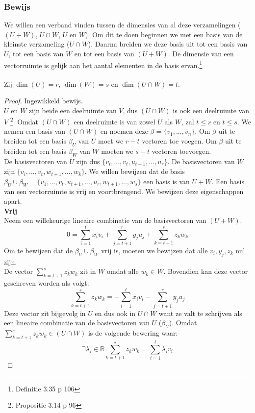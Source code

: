 \documentclass[lineaire_algebra_oplossingen.tex]{subfiles}
\begin{document}
\subsubsection*{Bewijs}
We willen een verband vinden tussen de dimensies van al deze verzamelingen ($(U+W)$, $U\cap W$, $U$ en $W$). Om dit te doen beginnen we met een basis van de kleinste verzameling ($U \cap W$). Daarna breiden we deze basis uit tot een basis van $U$, tot een basis van $W$ en tot een basis van $(U + W)$. De dimensie van een vectorruimte is gelijk aan het aantal elementen in de basis ervan.\footnote{Definitie 3.35 p 106}\\\\
Zij $\dim(U) = r$, $\dim(W)=s$ en $\dim(U\cap W) = t$.
\begin{proof}
Ingewikkeld bewijs.\\
$U$ en $W$ zijn beide een deelruimte van $V$, dus $(U \cap W)$ is ook een deelruimte van $V$ \footnote{Propositie 3.14 p 96}. Omdat $(U \cap W)$ een deelruimte is van zowel $U$ als $W$, zal $t \le r$ en $t \le s$. We nemen een basis van $(U\cap W)$ en noemen deze $\beta = \{v_1,...,v_n\}$. Om $\beta$ uit te breiden tot een basis $\beta_U$ van $U$ moet we $r-t$ vectoren toe voegen. Om $\beta$ uit te breiden tot een basis $\beta_W$ van $W$ moeten we $s-t$ vectoren toevoegen.\\
De basisvectoren van $U$ zijn dus $\{v_i,...,v_t,u_{t+1},...,u_r\}$. De basisvectoren van $W$ zijn $\{v_i,...,v_t,w_{t+1},...,w_k\}$.
We willen bewijzen dat de basis $\beta_U \cup \beta_W = \{v_1,...,v_t,u_{t+1},...,u_{r},w_{t+1},...,w_{s}\}$ een basis is van $U+W$.
Een basis van een vectorruimte is vrij en voortbrengend. We bewijzen deze eigenschappen apart.\\
\textbf{Vrij}\\
Neem een willekeurige lineaire combinatie van de basisvectoren van $(U+W)$.
\[
0 = \sum_{i=1}^tx_iv_i + \sum_{j=t+1}^ry_ju_j + \sum_{k=t+1}^sz_kw_k
\]
Om te bewijzen dat de $\beta_U \cup \beta_W$ vrij is, moeten we bewijzen dat alle $v_i,y_j,z_k$ nul zijn.\\
De vector $\sum_{k=t+1}^sz_kw_k$ zit in $W$ omdat alle $w_k \in W$. Bovendien kan deze vector geschreven worden als volgt:
\[
\sum_{k=t+1}^sz_kw_k = -\sum_{i=1}^tx_iv_i - \sum_{j=t+1}^ry_ju_j
\]
Deze vector zit bijgevolg in $U$ en dus ook in $U\cap W$ want ze valt te schrijven als een lineaire combinatie van de basisvectoren van $U$ ($\beta_U$).
Omdat $\sum_{k=t+1}^sz_kw_k \in (U\cap W)$ is de volgende bewering waar:
\[
\exists \lambda_i \in \mathbb{R} \sum_{k=t+1}^sz_kw_k = \sum_{i=1}^t\lambda_iv_i
\]
\end{proof}
\end{document}
